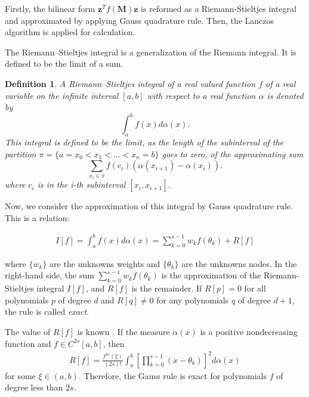 \documentclass[senior,final,11pt]{iscs-thesis}
\newtheorem{definition}{Definition}
\begin{document}
Firstly, the bilinear form $\mathbf{z}^{T}f(\mathbf{M})\mathbf{z}$ is reformed as a Riemann-Stieltjes integral and approximated by applying Gauss quadrature rule. Then, the Lanczos algorithm is applied for calculation.

The Riemann–Stieltjes integral is a generalization of the Riemann integral. It is defined to be the limit of a sum.
\begin{definition}
    A Riemann–Stieltjes integral of a real valued function $f$ of a real variable on the infinite interval $[a,b]$ with respect to a real function $\alpha$ is denoted by
    \[ \int_a^b f(x) d\alpha (x). \]
    This integral is defined to be the limit, as the length of the subinterval of the partition $\pi=\{a=x_0 < x_1 < ... < x_n = b\}$ goes to zero, of the approximating sum
    \[ \sum_{x_i \in \pi} f(c_i)(\alpha(x_{i+1}) - \alpha(x_i)).\]
    where $c_i$ is in the i-th subinterval $[x_i, x_{i+1}]$.
\end{definition}

Now, we consider the approximation of this integral by Gauss quadrature rule. This is a relation:

\begin{align}
    I[f] =\int_a^b f(x) d\alpha(x) = \sum_{k=0}^{s-1} w_k f(\theta_k) + R[f]
\end{align}

where $\{w_k\}$ are the unknowns weights and $\{\theta_k\}$ are the unknowns nodes. In the right-hand side, the sum $\sum_{k=0}^{s-1} w_k f(\theta_k)$ is the approximation of the Riemann-Stieltjes integral $I[f]$, and $R[f]$ is the remainder. If $R[p]=0$ for all polynomials $p$ of degree $d$ and $R[q] \neq 0$ for any polynomials $q$ of degree $d+1$, the rule is called {\it exact}.

The value of $R[f]$ is known \cite{golub2009matrices,stoer2013introduction}. If the measure $\alpha(x)$ is a positive nondecreasing function and $f \in C^{2s}[a,b]$, then
\begin{align}
    R[f] = \frac{f^{2s}(\xi)}{(2s)!} \int_a^b \left[\prod_{k=0}^{s-1}(x-\theta_k) \right]^2 d\alpha(x)
\end{align}
for some $\xi \in (a,b)$. Therefore, the Gauss rule is exact for polynomials $f$ of degree less than $2s$.
\end{document}
